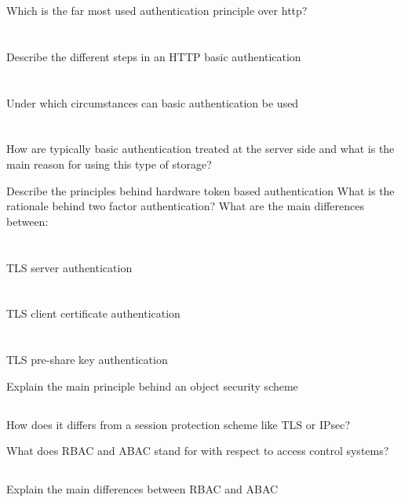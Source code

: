 \begin{questions}
\question{} Which is the far most used authentication principle over http?
  \begin{parts}
  \part{} Describe the different steps in an HTTP basic authentication
  \part{} Under which circumstances can basic authentication be used
  \part{} How are typically basic authentication treated at the server side and what is the main reason for using this type of storage?
  \end{parts}

\question{} Describe the principles behind hardware token based authentication
\question{} What is the rationale behind two factor authentication?
\question{} What are the main differences between:
  \begin{parts}
  \part{} TLS server authentication
  \part{} TLS client certificate authentication
  \part{} TLS pre-share key authentication
  \end{parts}

\question{} Explain the main principle behind an object security scheme
  \begin{parts}
  \part{} How does it differs from a session protection scheme like TLS or IPsec?
  \end{parts}

\question{} What does RBAC and ABAC stand for with respect to access control systems?
  \begin{parts}
  \part{} Explain the main differences between RBAC and ABAC
  \end{parts}


\end{questions}
